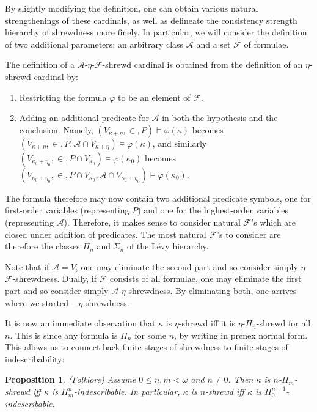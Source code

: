 \documentclass{article}
\theoremstyle{definition}
\theoremstyle{plain}
\theoremstyle{plain}
\theoremstyle{plain}
\newtheorem{proposition}[definition]{Proposition}
\theoremstyle{plain}
\theoremstyle{remark}
\theoremstyle{remark}
\theoremstyle{remark}
\theoremstyle{plain}
\theoremstyle{plain}
\theoremstyle{plain}
\begin{document}
By slightly modifying the definition, one can obtain various natural strengthenings of these cardinals, as well as delineate the consistency strength hierarchy of shrewdness more finely. In particular, we will consider the definition of two additional parameters: an arbitrary class $\mathcal{A}$ and a set $\mathcal{F}$ of formulae.

The definition of a $\mathcal{A}$-$\eta$-$\mathcal{F}$-shrewd cardinal is obtained from the definition of an $\eta$-shrewd cardinal by:

\begin{enumerate}
    \item Restricting the formula $\varphi$ to be an element of $\mathcal{F}$.
    \item Adding an additional predicate for $\mathcal{A}$ in both the hypothesis and the conclusion. Namely, $(V_{\kappa+\eta}, \in, P) \models \varphi(\kappa)$ becomes $(V_{\kappa+\eta}, \in, P, \mathcal{A} \cap V_{\kappa+\eta}) \models \varphi(\kappa)$, and similarly $(V_{\kappa_0+\eta_0}, \in, P \cap V_{\kappa_0}) \models \varphi(\kappa_0)$ becomes $(V_{\kappa_0+\eta_0}, \in, P \cap V_{\kappa_0}, \mathcal{A} \cap V_{\kappa_0+\eta_0}) \models \varphi(\kappa_0)$.
\end{enumerate}

The formula therefore may now contain two additional predicate symbols, one for first-order variables (representing $P$) and one for the highest-order variables (representing $\mathcal{A}$). Therefore, it makes sense to consider natural $\mathcal{F}$'s which are closed under addition of predicates. The most natural $\mathcal{F}$'s to consider are therefore the classes $\Pi_n$ and $\Sigma_n$ of the Lévy hierarchy.

Note that if $\mathcal{A} = V$, one may eliminate the second part and so consider simply $\eta$-$\mathcal{F}$-shrewdness. Dually, if $\mathcal{F}$ consists of all formulae, one may eliminate the first part and so consider simply $\mathcal{A}$-$\eta$-shrewdness. By eliminating both, one arrives where we started -- $\eta$-shrewdness.

It is now an immediate observation that $\kappa$ is $\eta$-shrewd iff it is $\eta$-$\Pi_n$-shrewd for all $n$. This is since any formula is $\Pi_n$ for some $n$, by writing in prenex normal form. This allows us to connect back finite stages of shrewdness to finite stages of indescribability:

\begin{proposition}
\label{ShrewdToIndesc}
(Folklore) Assume $0 \leq n, m < \omega$ and $n \neq 0$. Then $\kappa$ is $n$-$\Pi_m$-shrewd iff $\kappa$ is $\Pi^n_m$-indescribable. In particular, $\kappa$ is $n$-shrewd iff $\kappa$ is $\Pi^{n+1}_0$-indescribable.
\end{proposition}
\end{document}
